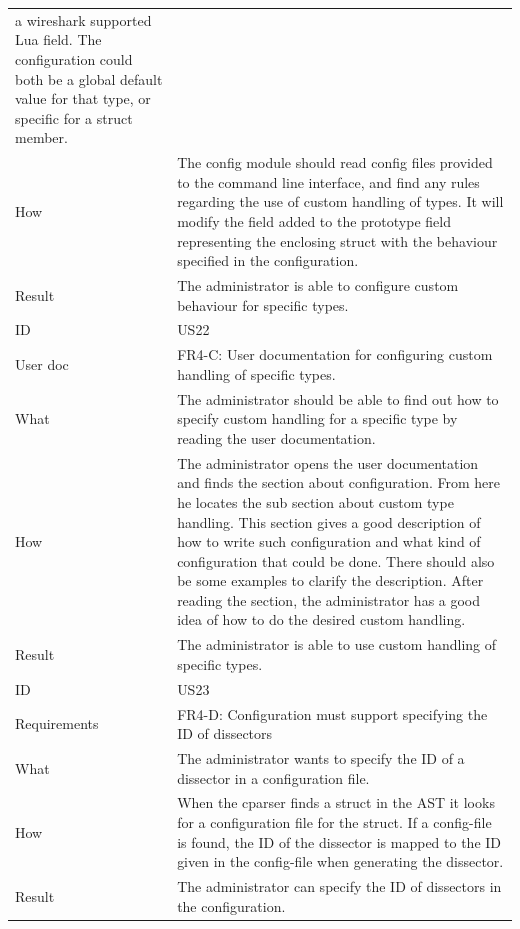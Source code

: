 \begin{table}[htbp]
{\begin{tabularx}{1.2\textwidth}{l X}
 	a \Gls{wireshark} supported Lua field. The configuration could both be a global default value for that type, or specific for a \gls{struct} \gls{member}. \\
	How & The config module should read config files provided to the command line interface, and find any rules regarding the use of custom handling of types.
 	It will modify the field added to the prototype field representing the enclosing \gls{struct} with the behaviour specified in the configuration. \\
	Result & The administrator is able to configure custom behaviour for specific types. \\
	\midrule
	ID & US22 \\
	User doc & FR4-C: User documentation for configuring custom handling of specific types. \\
	What & The administrator should be able to find out how to specify custom handling for a specific type by reading the user documentation.\\
	How & The administrator opens the user documentation and finds the section about configuration. From here he locates the sub section about custom type handling. 
	This section gives a good description of how to write such configuration and what kind of configuration that could be done. There should also be some
 	examples to clarify the description. After reading the section, the administrator has a good idea of how to do the desired custom handling. \\
	Result & The administrator is able to use custom handling of specific types. \\
	\midrule
	ID & US23 \\
	Requirements &  FR4-D: Configuration must support specifying the ID of \glspl{dissector} \\
	What & The administrator wants to specify the ID of a \gls{dissector} in a configuration file. \\
	How & When the cparser finds a \gls{struct} in the \gls{AST} it looks for a configuration file for the \gls{struct}. If a config-file is found, the ID of the \gls{dissector}
	is mapped to the ID given in the config-file when generating the \gls{dissector}. \\	
	Result & The administrator can specify the ID of \glspl{dissector} in the configuration. \\
	\midrule
	
\end{tabularx}}
\end{table}

